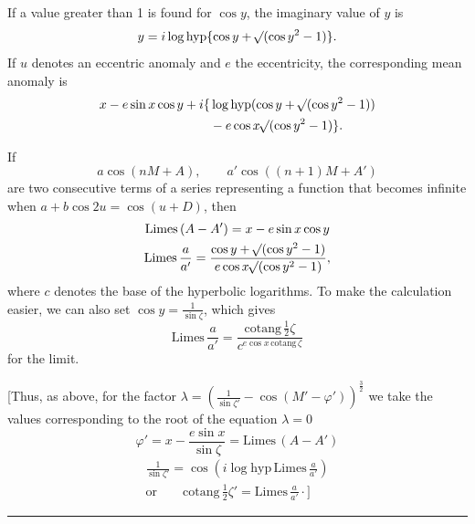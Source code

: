 If a value greater than 1 is found for \(\cos y\), the imaginary
value of \(y\) is
\[
y=i\log\mathrm{hyp}\{\cos y+\mathord{{}^{}\!\surd}(\cos y^2-1)\}.
\]
\noindent If \(u\) denotes an eccentric anomaly and \(e\) the eccentricity,
the corresponding mean anomaly is
\[
\begin{aligned}
x-e\sin x\cos y+i\{&\log\mathrm{hyp}(\cos y+\mathord{{}^{}\!\surd}(\cos y^2-1))\\
&-e\cos x\mathord{{}^{}\!\surd}(\cos y^2-1)\}.
\end{aligned}
\]
\par\noindent\hspace*{\parindent}If
\[
a\cos(nM+A),\qquad a'\cos((n+1)M+A')
\]
\noindent are two consecutive terms of a series representing a function that becomes
infinite when \(a+b\cos2u=\cos(u+D)\), then
\[
\begin{gathered}
\mathrm{Limes}\,(A-A')=x-e\sin x\cos y\\
\mathrm{Limes}\,\frac a{a'}=\frac{\cos y+\mathord{{}^{}\!\surd}(\cos y^2-1)}{e\cos x\mathord{{}^{}\!\surd}(\cos y^2-1)},
\end{gathered}
\]
\noindent where \(c\) denotes the base of the hyperbolic logarithms. To make
the calculation easier, we can also set \(\cos y=\frac1{\sin\zeta}\), which gives
\[
\mathrm{Limes}\,\frac a{a'}=\frac{\mathrm{cotang}\,\frac12\zeta}{c^{e\cos x\,\mathrm{cotang}\,\zeta}}
\]
\noindent for the limit.
\par\noindent\hspace*{\parindent}[Thus, as above, for the factor
\(\lambda=\left(\frac1{\sin\zeta'}-\cos(M'-\varphi')\right)^{\frac32}\) we take the values
corresponding to the root of the equation \(\lambda=0\)
\[
\varphi'=x-\frac{e\sin x}{\sin\zeta}=\mathrm{Limes}\,(A-A')
\]
\[
\begin{gathered}
\frac1{\sin\zeta'}=\cos\left(i\log\mathrm{hyp}\,\mathrm{Limes}\,\frac a{a'}\right)\\
\text{or}\qquad \mathrm{cotang}\,\tfrac12\zeta'=\mathrm{Limes}\,\frac a{a'}\mathpunct{\cdot}\Biggr]
\end{gathered}
\]
\par\medskip\begin{center}\rule{4em}{.4pt}\end{center}
\endgroup

\clearpage
\endgroup
